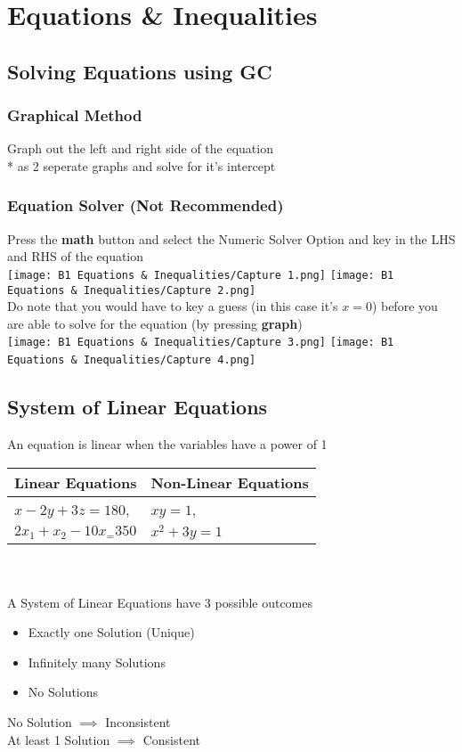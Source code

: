 \documentclass[../main.tex]{subfiles}
\begin{document}
\section{Equations \& Inequalities}

\subsection{Solving Equations using GC}
\subsubsection{Graphical Method}
Graph out the left and right side of the equation \\*
as 2 seperate graphs and solve for it's intercept

\subsubsection{Equation Solver (Not Recommended)}
Press the \textbf{math} button and select the Numeric Solver Option
and key in the LHS and RHS of the equation \\
\texttt{[image: B1 Equations \& Inequalities/Capture 1.png]}
\texttt{[image: B1 Equations \& Inequalities/Capture 2.png]} \\
Do note that you would have to key a guess (in this case it's \(x=0\))
before you are able to solve for the equation (by pressing \textbf{graph}) \\
\texttt{[image: B1 Equations \& Inequalities/Capture 3.png]}
\texttt{[image: B1 Equations \& Inequalities/Capture 4.png]}\


\subsection{System of Linear Equations}
An equation is linear when the variables have a power of 1 \\
\noindent
\begin{tabularx}{0.43\textwidth} {
    | >{\centering\arraybackslash}X
    | >{\centering\arraybackslash}X |}
    \hline
    Linear Equations & Non-Linear Equations \\
    \hline
    \(x-2y+3z=180\),  & \(xy=1\), \\
    \(2x_{1}+x_{2}-10x_=350\)  & \(x^{2}+3y=1\) \\
    \hline
\end{tabularx} \\\\
A System of Linear Equations have 3 possible outcomes
\begin{itemize}
    \item Exactly one Solution (Unique)
    \item Infinitely many Solutions
    \item No Solutions
\end{itemize}
No Solution \(\implies\) Inconsistent \\
At least 1 Solution \(\implies\) Consistent
\end{document}
